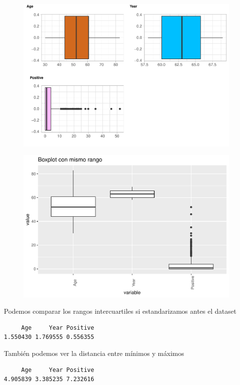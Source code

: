 \begin{figure}[H]\includegraphics[width=.9\linewidth]{img/EDA2_files/figure-latex/unnamed-chunk-11-4} \caption{}\end{figure}

\begin{figure}[H]\includegraphics[width=.9\linewidth]{img/EDA2_files/figure-latex/unnamed-chunk-12-1} \caption{}\end{figure}

\vspace{\baselineskip}

Podemos comparar los rangos intercuartiles si estandarizamos antes el dataset
\begin{verbatim}
     Age     Year Positive 
1.550430 1.769555 0.556355 
\end{verbatim}

También podemos ver la distancia entre mínimos y máximos

\begin{verbatim}
     Age     Year Positive 
4.905839 3.385235 7.232616 
\end{verbatim}

